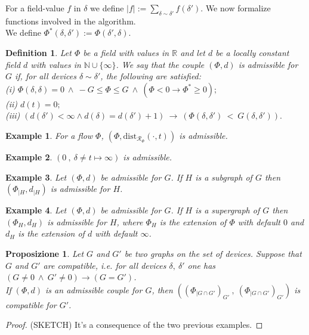 \documentclass{article}
\theoremstyle{plain}
\newtheorem{prop}[teo]{Proposizione}
\newtheorem{definition}{Definition}
\newtheorem{example}{Example}
\theoremstyle{remark}
\begin{document}
For a field-value $f$ in $\delta$ we define $\displaystyle{|f|:=\sum_{\delta\sim\delta'}f(\delta')}$.
We now formalize functions involved in the algorithm.\\
We define $\Phi^*(\delta, \delta'):=\Phi(\delta', \delta)$. \\
\begin{definition} Let $\Phi$ be a field with values in $\mathbb{R}$ and let $d$ be  a locally constant field $d$ with values in $\mathbb{N}\cup\{\infty\}$.
We say that the couple $(\Phi, d)$ is admissible for $G$ if, for all devices $\delta\sim \delta'$,  the following are satisfied:\\
(i) $ \Phi(\delta, \delta)=0\ \land\ -G\leq\Phi\leq G\ \land\ (\Phi<0\rightarrow \Phi^*\geq 0);$\\
(ii) $ d(t)=0;$\\
(iii) $ (d(\delta')<\infty \land d(\delta)=d(\delta')+1) \ \rightarrow\ (\Phi(\delta, \delta')\ <\ G(\delta, \delta')) .$
\end{definition}
\begin{example} For a flow $\Phi$,  $(\Phi, \mathrm{dist}_{\mathcal{R}_\Phi }(\cdot, t))$ is admissible.
\end{example}
\begin{example} $( 0\ ,\ \delta\not= t \mapsto \infty)$ is admissible.
\end{example}
\begin{example} Let  $(\Phi, d)$ be admissible for $G$. If $H$ is a subgraph of $G$ then $(\Phi_{|H}, d_{|H})$ is admissible for $H$.
\end{example}
\begin{example} Let  $(\Phi, d)$ be admissible for $G$. If $H$ is a supergraph of $G$  then $(\Phi_H, d_H)$ is admissible for $H$, where $\Phi_H$ is the extension of $\Phi$ with default $0$ and $d_H$ is the extension of $d$ with default $\infty$.
\end{example}

\begin{prop}
Let $G$ and $G'$ be two graphs on the set of devices. Suppose that $G$ and $G'$ are compatible, i.e. for all devices $\delta,\ \delta'$ one has \\
$\displaystyle{(G\not= 0 \ \land\ G'\not= 0)\rightarrow(G=G')}$.\\
If $(\Phi, d)$ is an admissible couple for $G$, then $((\Phi_{|G\cap G'})_{G'}\ ,\ (\Phi_{|G\cap G'})_{G'})$ is compatible for $G'$.
\end{prop}
\begin{proof} (SKETCH) It's a consequence of the two previous examples.
\end{proof}
\end{document}
